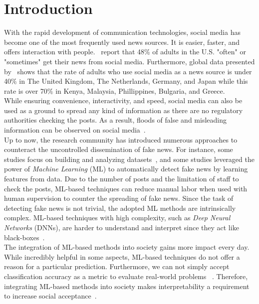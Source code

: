 
\chapter{Introduction}\label{chapter:introduction}

With the rapid development of communication technologies, social media has become one of the most frequently used news sources. It is easier, faster, and offers interaction with people.~\cite{NewsConsumptionAcrossSocialMedia_pewresearch} report that 48\% of adults in the U.S. "often" or "sometimes" get their news from social media. Furthermore, global data presented by~\cite{StatistaUsageOfSocialMedia_Watson} shows that the rate of adults who use social media as a news source is under 40\% in The United Kingdom, The Netherlands, Germany, and Japan while this rate is over 70\% in Kenya, Malaysia, Phillippines, Bulgaria, and Greece.\\
While ensuring convenience, interactivity, and speed, social media can also be used as a ground to spread any kind
of information as there are no regulatory authorities checking the posts. As a result, floods of false and misleading information can be observed on social media~\parencite{SocialMediaAndFakeNewsIn2016Election_Allcott}.\\
Up to now, the research community has introduced numerous approaches to counteract the uncontrolled dissemination of fake news. For instance, some studies focus on building and analyzing datasets~\parencite{FakeNewsDetectionOnSocialMediaADataMiningPerspective_Shu, LiarLiarPantsOnFire_Wang, FakeReddit_Nakamura, SomeLikeItHoaxDataset_Tacchini, BuzzfaceDataset_Santia, UPFD_Dataset_Shu}, and some studies leveraged the power of \emph{Machine Learning} (ML) to automatically detect fake news by learning features from data. Due to the number of posts and the limitation of staff to check the posts, ML-based techniques can reduce manual labor when used with human supervision to counter the spreading of fake news. Since the task of detecting fake news is not trivial, the adopted ML methods are intrinsically complex. ML-based techniques with high complexity, such as \emph{Deep Neural Networks} (DNNs), are harder to understand and interpret since they act like black-boxes~\parencite{CanWeOpenTheBlackBoxOfAI_Castelvecchi}.\\
The integration of ML-based methods into society gains more impact every day. While incredibly helpful in some aspects, ML-based techniques do not offer a reason for a particular prediction. Furthermore, we can not simply accept classification accuracy as a metric to evaluate real-world problems ~\parencite{TowardsARigorousScienceML_Velez}. Therefore, integrating ML-based methods into society makes interpretability a requirement to increase social acceptance~\parencite{InterpretableMachineLearning_Molnar}.\\
